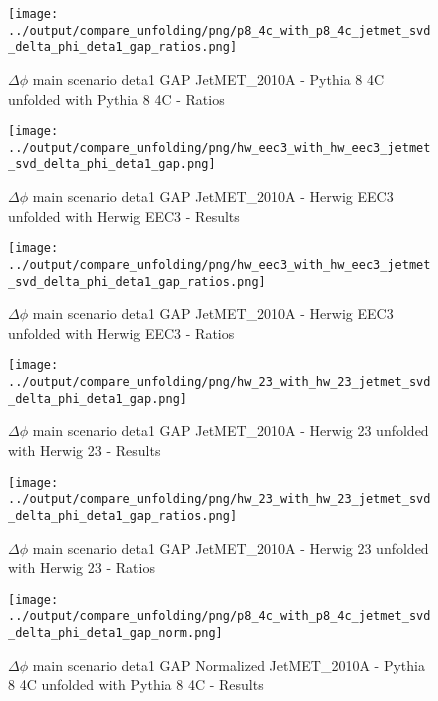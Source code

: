 \documentclass[11pt]{book}
\begin{document}
\begin{figure}[ht]
\centering
\texttt{[image: ../output/compare\_unfolding/png/p8\_4c\_with\_p8\_4c\_jetmet\_svd\_delta\_phi\_deta1\_gap\_ratios.png]}
\caption{$\Delta\phi$ main scenario deta1 GAP JetMET\_2010A - Pythia 8 4C unfolded with Pythia 8 4C - Ratios}
\label{p8_p8_jetmet_svd_delta_phi_deta1_gap_b}
\end{figure}

\begin{figure}[ht]
\centering
\texttt{[image: ../output/compare\_unfolding/png/hw\_eec3\_with\_hw\_eec3\_jetmet\_svd\_delta\_phi\_deta1\_gap.png]}
\caption{$\Delta\phi$ main scenario deta1 GAP JetMET\_2010A - Herwig EEC3 unfolded with Herwig EEC3 - Results}
\label{hw_eec3_hw_eec3_jetmet_svd_delta_phi_deta1_gap_a}
\end{figure}

\begin{figure}[ht]
\centering
\texttt{[image: ../output/compare\_unfolding/png/hw\_eec3\_with\_hw\_eec3\_jetmet\_svd\_delta\_phi\_deta1\_gap\_ratios.png]}
\caption{$\Delta\phi$ main scenario deta1 GAP JetMET\_2010A - Herwig EEC3 unfolded with Herwig EEC3 - Ratios}
\label{hw_eec3_hw_eec3_jetmet_svd_delta_phi_deta1_gap_b}
\end{figure}

\begin{figure}[ht]
\centering
\texttt{[image: ../output/compare\_unfolding/png/hw\_23\_with\_hw\_23\_jetmet\_svd\_delta\_phi\_deta1\_gap.png]}
\caption{$\Delta\phi$ main scenario deta1 GAP JetMET\_2010A - Herwig 23 unfolded with Herwig 23 - Results}
\label{hw_23_hw_23_jetmet_svd_delta_phi_deta1_gap_a}
\end{figure}

\begin{figure}[ht]
\centering
\texttt{[image: ../output/compare\_unfolding/png/hw\_23\_with\_hw\_23\_jetmet\_svd\_delta\_phi\_deta1\_gap\_ratios.png]}
\caption{$\Delta\phi$ main scenario deta1 GAP JetMET\_2010A - Herwig 23 unfolded with Herwig 23 - Ratios}
\label{hw_23_hw_23_jetmet_svd_delta_phi_deta1_gap_b}
\end{figure}


\begin{figure}[ht]
\centering
\texttt{[image: ../output/compare\_unfolding/png/p8\_4c\_with\_p8\_4c\_jetmet\_svd\_delta\_phi\_deta1\_gap\_norm.png]}
\caption{$\Delta\phi$ main scenario deta1 GAP Normalized JetMET\_2010A - Pythia 8 4C unfolded with Pythia 8 4C - Results}
\label{p8_p8_jetmet_svd_delta_phi_deta1_gap_norm_a}
\end{figure}
\end{document}
